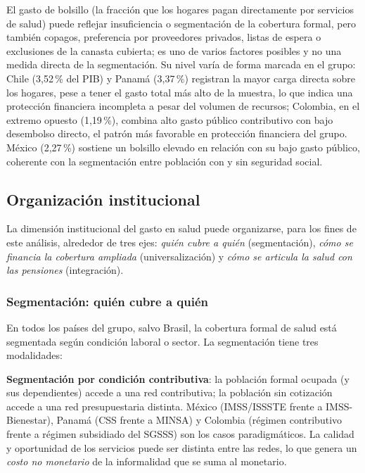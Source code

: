 \documentclass[12pt, letterpaper]{article}
\begin{document}
El gasto de bolsillo (la fracción que los hogares pagan directamente por servicios
de salud) puede reflejar insuficiencia o segmentación de la cobertura formal, pero
también copagos, preferencia por proveedores privados, listas de espera o
exclusiones de la canasta cubierta; es uno de varios factores posibles y no una
medida directa de la segmentación. Su nivel varía de forma marcada en el grupo: Chile (3{,}52\,\% del
PIB) y Panamá (3{,}37\,\%) registran la mayor carga directa sobre los hogares, pese a
tener el gasto total más alto de la muestra, lo que indica una protección financiera
incompleta a pesar del volumen de recursos; Colombia, en el extremo opuesto
(1{,}19\,\%), combina alto gasto público contributivo con bajo desembolso directo, el
patrón más favorable en protección financiera del grupo. México (2{,}27\,\%) sostiene
un bolsillo elevado en relación con su bajo gasto público, coherente con la
segmentación entre población con y sin seguridad social.

\subsection{Organización institucional}

La dimensión institucional del gasto en salud puede organizarse, para los fines de
este análisis, alrededor de tres ejes: \textit{quién cubre a quién} (segmentación),
\textit{cómo se financia la cobertura ampliada} (universalización) y
\textit{cómo se articula la salud con las pensiones} (integración).

\subsubsection{Segmentación: quién cubre a quién}
\label{sec:segmentacion}

En todos los países del grupo, salvo Brasil, la cobertura formal de salud está
segmentada según condición laboral o sector. La segmentación tiene tres
modalidades:

\textbf{Segmentación por condición contributiva}: la población formal ocupada (y
sus dependientes) accede a una red contributiva; la población sin cotización
accede a una red presupuestaria distinta. México (IMSS/ISSSTE frente a IMSS-Bienestar),
Panamá (CSS frente a MINSA) y Colombia (régimen contributivo frente a régimen subsidiado del
SGSSS) son los casos paradigmáticos. La calidad y oportunidad de los servicios
puede ser distinta entre las redes, lo que genera un \textit{costo no monetario} de
la informalidad que se suma al monetario.
\end{document}
